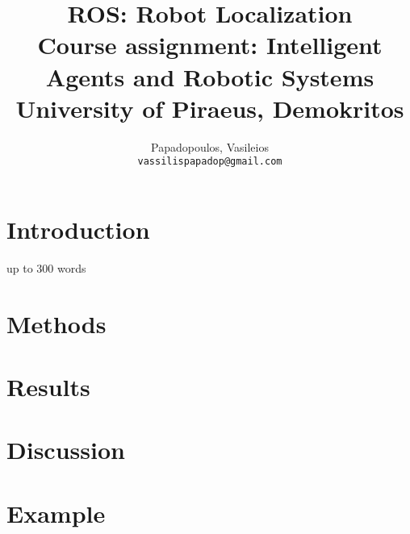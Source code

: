 \documentclass[10pt,a4paper,twocolumn]{article}
\title{%
	ROS: Robot Localization \\
	\large Course assignment: Intelligent Agents and Robotic Systems \\
	University of Piraeus, Demokritos}
\author{
	Papadopoulos, Vasileios\\
	\texttt{vassilispapadop@gmail.com}
}
\begin{document}
	\maketitle
	
\section{Introduction}
up to 300 words


\section{Methods}
	
\section{Results}

\section{Discussion}

\section{Example}

\begin{thebibliography}{9}

	
\end{thebibliography}
	
	
\end{document}
